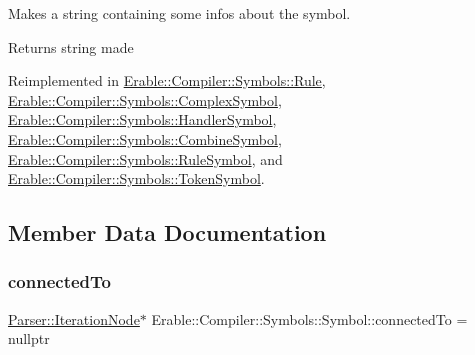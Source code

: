 Makes a string containing some infos about the symbol. \begin{DoxyReturn}{Returns}
string made 
\end{DoxyReturn}


Reimplemented in \mbox{\hyperlink{class_erable_1_1_compiler_1_1_symbols_1_1_rule_a8bb5224d85a4867c71b6c1bc7ec901c0}{Erable\+::\+Compiler\+::\+Symbols\+::\+Rule}}, \mbox{\hyperlink{class_erable_1_1_compiler_1_1_symbols_1_1_complex_symbol_a90d749e601a727d6d42ddb195e65ea37}{Erable\+::\+Compiler\+::\+Symbols\+::\+Complex\+Symbol}}, \mbox{\hyperlink{class_erable_1_1_compiler_1_1_symbols_1_1_handler_symbol_ae0846995b3c622180725b160a1e17f8a}{Erable\+::\+Compiler\+::\+Symbols\+::\+Handler\+Symbol}}, \mbox{\hyperlink{struct_erable_1_1_compiler_1_1_symbols_1_1_combine_symbol_aedd44bc23607d42bdb45a35aba3dd184}{Erable\+::\+Compiler\+::\+Symbols\+::\+Combine\+Symbol}}, \mbox{\hyperlink{class_erable_1_1_compiler_1_1_symbols_1_1_rule_symbol_a068e32fb9ed0059c3da44fe47402a084}{Erable\+::\+Compiler\+::\+Symbols\+::\+Rule\+Symbol}}, and \mbox{\hyperlink{class_erable_1_1_compiler_1_1_symbols_1_1_token_symbol_a0f8499152ff070ae70295c9b25b25b93}{Erable\+::\+Compiler\+::\+Symbols\+::\+Token\+Symbol}}.



\subsection{Member Data Documentation}
\mbox{\label{class_erable_1_1_compiler_1_1_symbols_1_1_symbol_a8fcbecdc112fd91cfec407895a0783ae}} 
\subsubsection{\texorpdfstring{connectedTo}{connectedTo}}
{\footnotesize\ttfamily \mbox{\hyperlink{struct_erable_1_1_compiler_1_1_parser_1_1_iteration_node}{Parser\+::\+Iteration\+Node}}$\ast$ Erable\+::\+Compiler\+::\+Symbols\+::\+Symbol\+::connected\+To = nullptr}

\mbox{\label{class_erable_1_1_compiler_1_1_symbols_1_1_symbol_a255a19e654587d40b8f78e89fb4e7c73}} 

